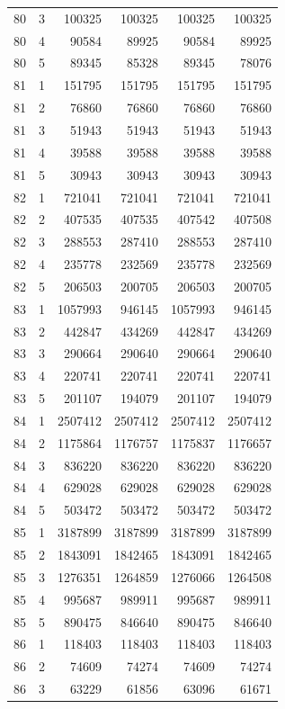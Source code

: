 \begin{longtable}{rrrrrr}
80 & 3 & 100325 & 100325 & 100325 & 100325 \\
80 & 4 & 90584 & 89925 & 90584 & 89925 \\
80 & 5 & 89345 & 85328 & 89345 & 78076 \\
81 & 1 & 151795 & 151795 & 151795 & 151795 \\
81 & 2 & 76860 & 76860 & 76860 & 76860 \\
81 & 3 & 51943 & 51943 & 51943 & 51943 \\
81 & 4 & 39588 & 39588 & 39588 & 39588 \\
81 & 5 & 30943 & 30943 & 30943 & 30943 \\
82 & 1 & 721041 & 721041 & 721041 & 721041 \\
82 & 2 & 407535 & 407535 & 407542 & 407508 \\
82 & 3 & 288553 & 287410 & 288553 & 287410 \\
82 & 4 & 235778 & 232569 & 235778 & 232569 \\
82 & 5 & 206503 & 200705 & 206503 & 200705 \\
83 & 1 & 1057993 & 946145 & 1057993 & 946145 \\
83 & 2 & 442847 & 434269 & 442847 & 434269 \\
83 & 3 & 290664 & 290640 & 290664 & 290640 \\
83 & 4 & 220741 & 220741 & 220741 & 220741 \\
83 & 5 & 201107 & 194079 & 201107 & 194079 \\
84 & 1 & 2507412 & 2507412 & 2507412 & 2507412 \\
84 & 2 & 1175864 & 1176757 & 1175837 & 1176657 \\
84 & 3 & 836220 & 836220 & 836220 & 836220 \\
84 & 4 & 629028 & 629028 & 629028 & 629028 \\
84 & 5 & 503472 & 503472 & 503472 & 503472 \\
85 & 1 & 3187899 & 3187899 & 3187899 & 3187899 \\
85 & 2 & 1843091 & 1842465 & 1843091 & 1842465 \\
85 & 3 & 1276351 & 1264859 & 1276066 & 1264508 \\
85 & 4 & 995687 & 989911 & 995687 & 989911 \\
85 & 5 & 890475 & 846640 & 890475 & 846640 \\
86 & 1 & 118403 & 118403 & 118403 & 118403 \\
86 & 2 & 74609 & 74274 & 74609 & 74274 \\
86 & 3 & 63229 & 61856 & 63096 & 61671 \\

\end{longtable}
